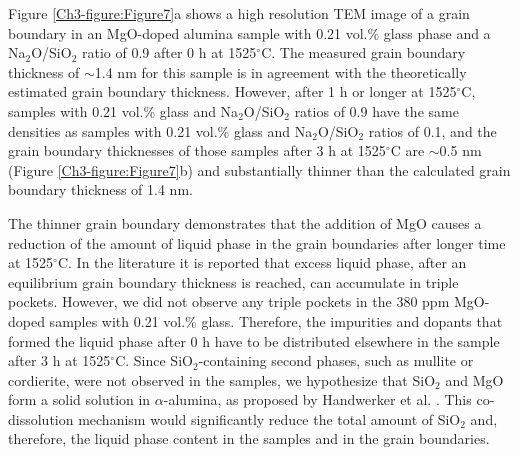Figure \ref{Ch3-figure:Figure7}a shows a high resolution TEM image of a grain boundary in an MgO-doped alumina sample with 0.21 vol.\% glass phase and a Na$_{2}$O/SiO$_{2}$ ratio of 0.9 after 0 h at 1525$^{\circ}$C. The measured grain boundary thickness of $\sim$1.4 nm for this sample is in agreement with the theoretically estimated \cite{Frueh2016a} grain boundary thickness. However, after 1 h or longer at 1525$^{\circ}$C, samples with 0.21 vol.\% glass and Na$_{2}$O/SiO$_{2}$ ratios of 0.9 have the same densities as samples with 0.21 vol.\% glass and Na$_{2}$O/SiO$_{2}$ ratios of 0.1, and the grain boundary thicknesses of those samples after 3 h at 1525$^{\circ}$C are $\sim$0.5 nm (Figure \ref{Ch3-figure:Figure7}b) and substantially thinner than the calculated grain boundary thickness of 1.4 nm.

The thinner grain boundary demonstrates that the addition of MgO causes a reduction of the amount of liquid phase in the grain boundaries after longer time at 1525$^{\circ}$C. In the literature it is reported that excess liquid phase, after an equilibrium grain boundary thickness \cite{Subramaniam2006} is reached, can accumulate in triple pockets. However, we did not observe any triple pockets in the 380 ppm MgO-doped samples with 0.21 vol.\% glass. Therefore, the impurities and dopants that formed the liquid phase after 0 h have to be distributed elsewhere in the sample after 3 h at 1525$^{\circ}$C. Since SiO$_{2}$-containing second phases, such as mullite or cordierite, were not observed in the samples, we hypothesize that SiO$_{2}$ and MgO form a solid solution in $\alpha$-alumina, as proposed by Handwerker et al. \cite{Handwerker1989}. This co-dissolution mechanism would significantly reduce the total amount of SiO$_{2}$ and, therefore, the liquid phase content in the samples and in the grain boundaries. 

